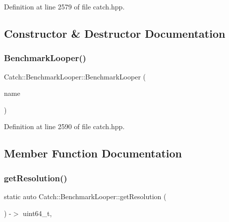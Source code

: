 Definition at line 2579 of file catch.\+hpp.



\subsection{Constructor \& Destructor Documentation}
\mbox{\label{class_catch_1_1_benchmark_looper_ab9ba6397306a70082f39e63a8a71bde6}} 
\subsubsection{BenchmarkLooper()}
{\footnotesize\ttfamily Catch\+::\+Benchmark\+Looper\+::\+Benchmark\+Looper (\begin{DoxyParamCaption}\item[{\textbf{ String\+Ref}}]{name }\end{DoxyParamCaption})\hspace{0.3cm}{\ttfamily [inline]}}



Definition at line 2590 of file catch.\+hpp.



\subsection{Member Function Documentation}
\mbox{\label{class_catch_1_1_benchmark_looper_a45fd79f05ac1fb21dcfb3a81cf052705}} 
\subsubsection{getResolution()}
{\footnotesize\ttfamily static auto Catch\+::\+Benchmark\+Looper\+::get\+Resolution (\begin{DoxyParamCaption}{ }\end{DoxyParamCaption}) -\/$>$  uint64\+\_\+t\hspace{0.3cm}{\ttfamily [static]}, {\ttfamily [private]}}

\mbox{\label{class_catch_1_1_benchmark_looper_a210552aff5b19408637444d4bb35d59c}} 
